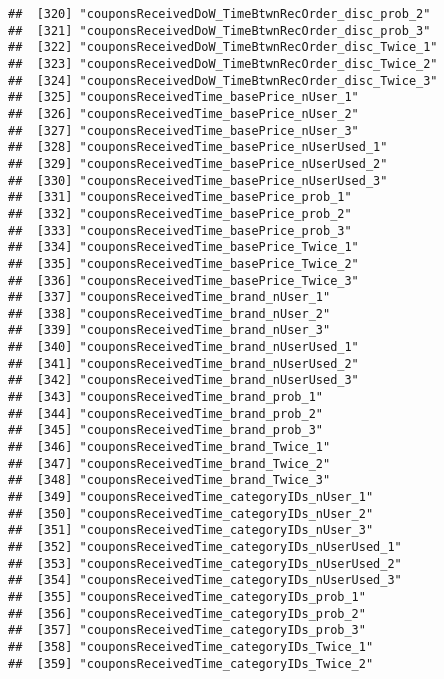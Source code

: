 \documentclass[10pt]{report}
\begin{document}
\begin{verbatim}
##  [320] "couponsReceivedDoW_TimeBtwnRecOrder_disc_prob_2"      
##  [321] "couponsReceivedDoW_TimeBtwnRecOrder_disc_prob_3"      
##  [322] "couponsReceivedDoW_TimeBtwnRecOrder_disc_Twice_1"     
##  [323] "couponsReceivedDoW_TimeBtwnRecOrder_disc_Twice_2"     
##  [324] "couponsReceivedDoW_TimeBtwnRecOrder_disc_Twice_3"     
##  [325] "couponsReceivedTime_basePrice_nUser_1"                
##  [326] "couponsReceivedTime_basePrice_nUser_2"                
##  [327] "couponsReceivedTime_basePrice_nUser_3"                
##  [328] "couponsReceivedTime_basePrice_nUserUsed_1"            
##  [329] "couponsReceivedTime_basePrice_nUserUsed_2"            
##  [330] "couponsReceivedTime_basePrice_nUserUsed_3"            
##  [331] "couponsReceivedTime_basePrice_prob_1"                 
##  [332] "couponsReceivedTime_basePrice_prob_2"                 
##  [333] "couponsReceivedTime_basePrice_prob_3"                 
##  [334] "couponsReceivedTime_basePrice_Twice_1"                
##  [335] "couponsReceivedTime_basePrice_Twice_2"                
##  [336] "couponsReceivedTime_basePrice_Twice_3"                
##  [337] "couponsReceivedTime_brand_nUser_1"                    
##  [338] "couponsReceivedTime_brand_nUser_2"                    
##  [339] "couponsReceivedTime_brand_nUser_3"                    
##  [340] "couponsReceivedTime_brand_nUserUsed_1"                
##  [341] "couponsReceivedTime_brand_nUserUsed_2"                
##  [342] "couponsReceivedTime_brand_nUserUsed_3"                
##  [343] "couponsReceivedTime_brand_prob_1"                     
##  [344] "couponsReceivedTime_brand_prob_2"                     
##  [345] "couponsReceivedTime_brand_prob_3"                     
##  [346] "couponsReceivedTime_brand_Twice_1"                    
##  [347] "couponsReceivedTime_brand_Twice_2"                    
##  [348] "couponsReceivedTime_brand_Twice_3"                    
##  [349] "couponsReceivedTime_categoryIDs_nUser_1"              
##  [350] "couponsReceivedTime_categoryIDs_nUser_2"              
##  [351] "couponsReceivedTime_categoryIDs_nUser_3"              
##  [352] "couponsReceivedTime_categoryIDs_nUserUsed_1"          
##  [353] "couponsReceivedTime_categoryIDs_nUserUsed_2"          
##  [354] "couponsReceivedTime_categoryIDs_nUserUsed_3"          
##  [355] "couponsReceivedTime_categoryIDs_prob_1"               
##  [356] "couponsReceivedTime_categoryIDs_prob_2"               
##  [357] "couponsReceivedTime_categoryIDs_prob_3"               
##  [358] "couponsReceivedTime_categoryIDs_Twice_1"              
##  [359] "couponsReceivedTime_categoryIDs_Twice_2"              

\end{verbatim}
\end{document}
